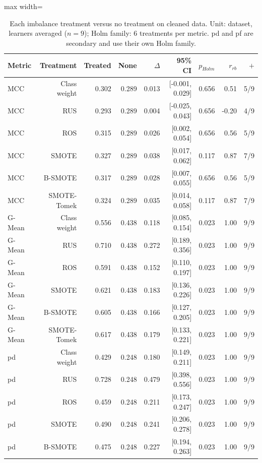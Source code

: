 \begin{table}[t]
\centering
\footnotesize
\caption{Each imbalance treatment versus no treatment on cleaned data. Unit: dataset, learners averaged ($n=9$); Holm family: 6 treatments per metric. pd and pf are secondary and use their own Holm family.}
\label{tab:vsnone}
\begin{adjustbox}{max width=\linewidth}
\begin{tabular}{lrrrrrrrr}
\toprule
Metric & Treatment & Treated & None & $\Delta$ & 95\% CI & $p_{Holm}$ & $r_{rb}$ & $+$ \\
\midrule
MCC & Class weight & 0.302 & 0.289 & 0.013 & [-0.001, 0.029] & 0.656 & 0.51 & 5/9 \\
MCC & RUS & 0.293 & 0.289 & 0.004 & [-0.025, 0.043] & 0.656 & -0.20 & 4/9 \\
MCC & ROS & 0.315 & 0.289 & 0.026 & [0.002, 0.054] & 0.656 & 0.56 & 5/9 \\
MCC & SMOTE & 0.327 & 0.289 & 0.038 & [0.017, 0.062] & 0.117 & 0.87 & 7/9 \\
MCC & B-SMOTE & 0.317 & 0.289 & 0.028 & [0.007, 0.055] & 0.656 & 0.56 & 5/9 \\
MCC & SMOTE-Tomek & 0.324 & 0.289 & 0.035 & [0.014, 0.058] & 0.117 & 0.87 & 7/9 \\
G-Mean & Class weight & 0.556 & 0.438 & 0.118 & [0.085, 0.154] & 0.023 & 1.00 & 9/9 \\
G-Mean & RUS & 0.710 & 0.438 & 0.272 & [0.189, 0.356] & 0.023 & 1.00 & 9/9 \\
G-Mean & ROS & 0.591 & 0.438 & 0.152 & [0.110, 0.197] & 0.023 & 1.00 & 9/9 \\
G-Mean & SMOTE & 0.621 & 0.438 & 0.183 & [0.136, 0.226] & 0.023 & 1.00 & 9/9 \\
G-Mean & B-SMOTE & 0.605 & 0.438 & 0.166 & [0.127, 0.205] & 0.023 & 1.00 & 9/9 \\
G-Mean & SMOTE-Tomek & 0.617 & 0.438 & 0.179 & [0.133, 0.221] & 0.023 & 1.00 & 9/9 \\
pd & Class weight & 0.429 & 0.248 & 0.180 & [0.149, 0.211] & 0.023 & 1.00 & 9/9 \\
pd & RUS & 0.728 & 0.248 & 0.479 & [0.398, 0.556] & 0.023 & 1.00 & 9/9 \\
pd & ROS & 0.459 & 0.248 & 0.211 & [0.173, 0.247] & 0.023 & 1.00 & 9/9 \\
pd & SMOTE & 0.490 & 0.248 & 0.241 & [0.206, 0.278] & 0.023 & 1.00 & 9/9 \\
pd & B-SMOTE & 0.475 & 0.248 & 0.227 & [0.194, 0.263] & 0.023 & 1.00 & 9/9 \\

\end{tabular}
\end{adjustbox}
\end{table}
